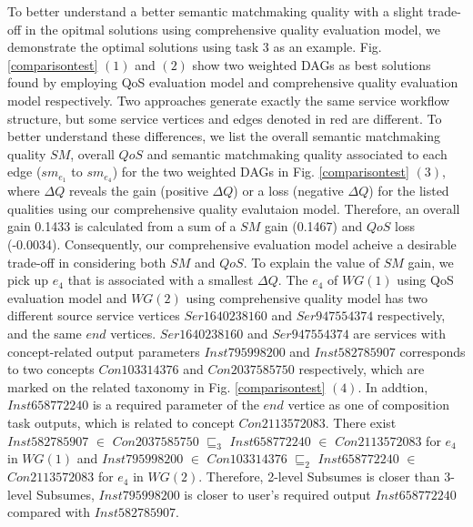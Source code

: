 \documentclass{llncs}
\begin{document}
To better understand a better semantic matchmaking quality with a slight trade-off in the opitmal solutions using comprehensive quality evaluation model, we demonstrate the optimal solutions using task 3 as an example. Fig. \ref{comparisontest} $(1)$ and $(2)$ show two weighted DAGs as best solutions found by employing QoS evaluation model and comprehensive quality evaluation model respectively. Two approaches generate exactly the same service workflow structure, but some service vertices and edges denoted in red are different. To better understand these differences, we list the overall semantic matchmaking quality $SM$,  overall $QoS$ and semantic matchmaking quality associated to each edge ($sm_{e_1}$ to $sm_{e_4}$) for the two weighted DAGs in Fig. \ref{comparisontest} $(3)$, where $\Delta Q$ reveals the gain (positive $\Delta Q$) or a loss (negative $\Delta Q$) for the listed qualities using our comprehensive quality evalutaion model. Therefore, an overall gain 0.1433 is calculated from a sum of a $SM$ gain (0.1467) and $QoS$ loss (-0.0034). Consequently, our comprehensive evaluation model acheive a desirable trade-off in considering both $SM$ and $QoS$. To explain the value of $SM$ gain, we pick up $e_4$ that is associated with a smallest $\Delta Q$. The $e_4$ of $WG(1)$ using QoS evaluation model and $WG(2)$ using comprehensive quality model has two different source service vertices $Ser1640238160$ and $Ser947554374$ respectively,  and the same $end$ vertices. $Ser1640238160$ and $Ser947554374$ are services with concept-related output parameters $Inst795998200$ and $Inst582785907$ corresponds to two concepts $Con103314376$ and $Con2037585750$ respectively, which are marked on the related taxonomy in Fig. \ref{comparisontest} $(4)$. In addtion, $Inst658772240$ is a required parameter of the $end$ vertice as one of composition task outputs, which is related to concept $Con2113572083$. There exist $Inst582785907$ $\in$ $Con2037585750$ $\sqsubseteq_{3}$ $Inst658772240$ $\in$ $Con2113572083$ for $e_4$ in $WG(1)$ and $Inst795998200$ $\in$ $Con103314376$ $\sqsubseteq_{2}$ $Inst658772240$ $\in$ $Con2113572083$ for $e_4$ in $WG(2)$. Therefore, 2-level Subsumes is closer than 3-level Subsumes, $Inst795998200$ is closer to user's required output $Inst658772240$ compared with $Inst582785907$.
\end{document}
